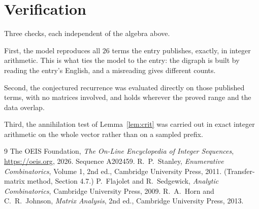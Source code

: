 \documentclass[11pt,a4paper]{article}
\theoremstyle{plain}
\theoremstyle{definition}
\begin{document}
\section{Verification}

Three checks, each independent of the algebra above.

First, the model reproduces all $26$ terms the entry publishes, exactly, in integer
arithmetic. This is what ties the model to the entry: the digraph is built by reading the
entry's English, and a misreading gives different counts.

Second, the conjectured recurrence was evaluated directly on those published terms, with no
matrices involved, and holds wherever the proved range and the data overlap.

Third, the annihilation test of Lemma~\ref{lem:crit} was carried out in exact integer
arithmetic on the whole vector rather than on a sampled prefix.

\begin{thebibliography}{9}
 The OEIS Foundation, \emph{The On-Line Encyclopedia of Integer
Sequences}, \url{https://oeis.org}, 2026. Sequence A202459.
 R.~P.~Stanley, \emph{Enumerative Combinatorics}, Volume 1, 2nd ed.,
Cambridge University Press, 2011. (Transfer-matrix method, Section 4.7.)
 P.~Flajolet and R.~Sedgewick, \emph{Analytic Combinatorics}, Cambridge
University Press, 2009.
 R.~A.~Horn and C.~R.~Johnson, \emph{Matrix Analysis}, 2nd ed., Cambridge
University Press, 2013.
\end{thebibliography}
\end{document}
